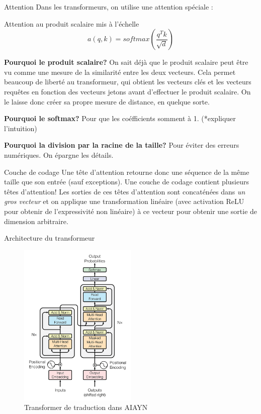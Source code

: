 \documentclass{beamer}
\begin{document}
\begin{frame}{Attention}
Dans les transformeurs, on utilise une attention spéciale :
\begin{block}{Attention au produit scalaire mis à l'échelle}
    \[ a(q, k) = softmax( \frac{q^Tk}{\sqrt{d}}) \]
\end{block}


{\bf Pourquoi le produit scalaire?}
On sait déjà que le produit scalaire peut être vu comme une mesure de la similarité entre
les deux vecteurs. Cela permet beaucoup de liberté au transformeur, qui obtient les vecteurs clés et les vecteurs requêtes en fonction des vecteurs jetons avant d'effectuer le produit scalaire. On le laisse donc créer sa propre mesure de distance, en quelque sorte.

\end{frame}

\begin{frame}{}
    
{\bf Pourquoi le softmax?}
Pour que les coéfficients somment à 1. (*expliquer l'intuition)

{\bf Pourquoi la division par la racine de la taille? }
Pour éviter des erreurs numériques. On épargne les détails.

\end{frame}

\begin{frame}{Couche de codage}
    Une tête d'attention retourne donc une séquence de la même taille que son entrée (sauf exceptions).
    Une couche de codage contient plusieurs têtes d'attention! Les sorties de ces 
    têtes d'attention sont concaténées dans {\it un gros vecteur} et on applique une transformation 
    linéaire (avec activation ReLU pour obtenir de l'expressivité non linéaire) à ce vecteur pour obtenir une sortie 
    de dimension arbitraire.
\end{frame}

\begin{frame}{Architecture du transformeur}
\begin{figure} \label{fig:transformer}
    \caption{Transformer de traduction dans AIAYN} \center
    \includegraphics[width=0.5\textwidth]{images/2023-04-04-14-37-09.png}
\end{figure}
\end{frame}
\end{document}
